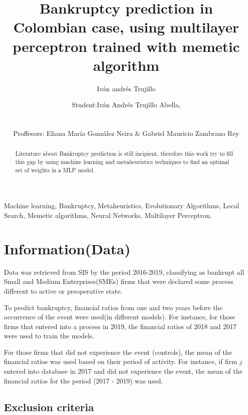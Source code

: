 \documentclass[journal]{IEEEtai}
\begin{document}
\title{Bankruptcy prediction in Colombian case, using multilayer perceptron trained with memetic algorithm} 


\author{ Iván andrés Trujillo }

\author{Student:Iván Andrés Trujillo Abella,\\

\\
\\

Proffesors: Eliana María González Neira \& Gabriel Mauricio Zambrano Rey}
\maketitle
\begin{abstract}
Literature about Bankruptcy prediction is still incipient, therefore this work try to fill this gap by using machine learning  and metaheuristics techniques to find an optimal set of  weights in a MLP model.
\end{abstract}


\begin{IEEEkeywords}
Machine learning, Bankruptcy, Metaheuristics, Evolutionary Algorithms, Local Search, Memetic algorithms, Neural Networks, Multilayer Perceptron.
\end{IEEEkeywords}




\section{Information(Data)}

Data was retrieved from SIS by the period 2016-2019, classifying as bankrupt all Small and Medium Enterprises(SMEs) firms  that were declared some process different to active or preoperative state.


To predict bankruptcy, financial ratios from one and two years before the occurrence of the event were used(in different models). For instance, for those firms that entered into a process in 2019,  the financial ratios of 2018 and 2017 were used to train the models.


For those firms that did not experience the event (controls), the mean of the financial ratios was used based on their period of activity. For instance, if firm $j$ entered into database in 2017 and did not experience the event, the mean of the financial ratios for the period (2017 - 2019) was used.
\subsection{Exclusion criteria}
\end{document}
